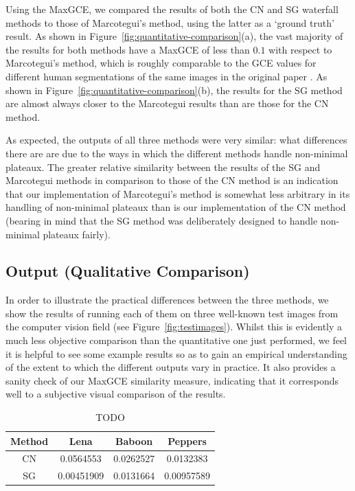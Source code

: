 \documentclass[preprint,a4paper]{elsarticle}
\begin{document}
Using the MaxGCE, we compared the results of both the CN and SG waterfall methods to those of Marcotegui's method, using the latter as a `ground truth' result. As shown in Figure~\ref{fig:quantitative-comparison}(a), the vast majority of the results for both methods have a MaxGCE of less than $0.1$ with respect to Marcotegui's method, which is roughly comparable to the GCE values for different human segmentations of the same images in the original paper \cite{martin01}. As shown in Figure~\ref{fig:quantitative-comparison}(b), the results for the SG method are almost always closer to the Marcotegui results than are those for the CN method.

As expected, the outputs of all three methods were very similar: what differences there are are due to the ways in which the different methods handle non-minimal plateaux. The greater relative similarity between the results of the SG and Marcotegui methods in comparison to those of the CN method is an indication that our implementation of Marcotegui's method is somewhat less arbitrary in its handling of non-minimal plateaux than is our implementation of the CN method (bearing in mind that the SG method was deliberately designed to handle non-minimal plateaux fairly).


\iffalse
\subsection{Output (Qualitative Comparison)}

In order to illustrate the practical differences between the three methods, we show the results of running each of them on three well-known test images from the computer vision field (see Figure~\ref{fig:testimages}). Whilst this is evidently a much less objective comparison than the quantitative one just performed, we feel it is helpful to see some example results so as to gain an empirical understanding of the extent to which the different outputs vary in practice. It also provides a sanity check of our MaxGCE similarity measure, indicating that it corresponds well to a subjective visual comparison of the results.

\begin{table}
\begin{center}
\begin{tabular}{c|ccc}
\textbf{Method} & \textbf{Lena} & \textbf{Baboon} & \textbf{Peppers} \\
\hline
CN & 0.0564553 & 0.0262527 & 0.0132383 \\
SG & 0.00451909 & 0.0131664 & 0.00957589
\end{tabular}
\end{center}
\caption{TODO}
\label{tbl:qualitative-comparison}
\end{table}
\end{document}
